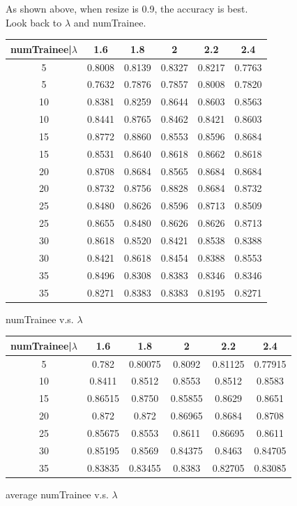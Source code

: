 \documentclass[sigconf]{acmart}
\begin{document}
As shown above, when resize is 0.9, the accuracy is best.\\

Look back to $\lambda$ and numTrainee.\\


\begin{center}
	\begin{tabular}{cccccc}
	\hline
numTrainee|$\lambda$&	1.6&	 1.8&	2&	2.2&	 2.4\\
	\hline
5&	0.8008&	0.8139&	0.8327&	0.8217&	0.7763\\
5&	0.7632&	0.7876&	0.7857&	0.8008&	0.7820\\
10&	0.8381&	0.8259&	0.8644&	0.8603&	0.8563\\
10&	0.8441&	0.8765&	0.8462&	0.8421&	0.8603\\
15&	0.8772&	0.8860&	0.8553&	0.8596&	0.8684\\
15&	0.8531&	0.8640&	0.8618&	0.8662&	0.8618\\
20&	0.8708&	0.8684&	0.8565&	0.8684&	0.8684\\
20&	0.8732&	0.8756&	0.8828&	0.8684&	0.8732\\
25&	0.8480&	0.8626&	0.8596&	0.8713&	0.8509\\
25&	0.8655&	0.8480&	0.8626&	0.8626&	0.8713\\
30&	0.8618&	0.8520&	0.8421&	0.8538&	0.8388\\
30&	0.8421&	0.8618&	0.8454&	0.8388&	0.8553\\
35&	0.8496&	0.8308&	0.8383&	0.8346&	0.8346\\
35&	0.8271&	0.8383&	0.8383&	0.8195&	0.8271\\
	\hline
	\end{tabular}
	numTrainee v.s. $\lambda$
\end{center}



\begin{center}
	\begin{tabular}{cccccc}
	\hline
numTrainee|$\lambda$&	1.6&	 1.8&	2&	2.2&	 2.4\\
	\hline

5&	0.782&	0.80075&	0.8092&	0.81125&	0.77915\\
10&	0.8411&	0.8512&	0.8553&	0.8512&	0.8583\\
15&	0.86515&	0.8750&	0.85855&	0.8629&	0.8651\\
20&	0.872&	0.872&	0.86965&	0.8684&	0.8708\\
25&	0.85675&	0.8553&	0.8611&	0.86695&	0.8611\\
30&	0.85195&	0.8569&	0.84375&	0.8463&	0.84705\\
35&	0.83835&	0.83455&	0.8383&	0.82705&	0.83085\\

	\hline
	\end{tabular}
	average numTrainee v.s. $\lambda$
\end{center}
\end{document}

